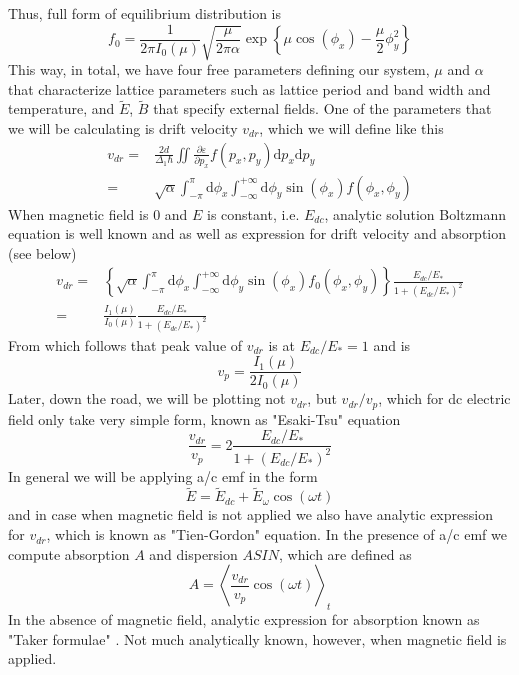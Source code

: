 \documentclass[40pt,letterpaper,physrev]{article}
\begin{document}
    Thus, full form of equilibrium distribution is
    \begin{equation}
    \boxed{
	f_0=\frac{1}{2\pi I_0(\mu)}\sqrt{\frac{\mu}{2\pi\alpha}}\exp{\left \{ \mu\cos(\phi_x)-\frac{\mu}{2}\phi^2_y\right \} } }
	\end{equation}
	This way, in total, we have four free parameters defining our system, $\mu$ and $\alpha$ that characterize lattice parameters such as lattice period and band width and temperature, and $\tilde{E}$, $\tilde{B}$ that specify external fields.
	One of the parameters that we will be calculating is drift 
	velocity $v_{dr}$, which we will define like this
	\begin{align}
		v_{dr}=&\frac{2d}{\Delta_1\hbar}\iint
			\frac{\partial\varepsilon}{\partial p_x}f(p_x,p_y)\text{d}p_x\text{d}p_y \\
			=&\sqrt{\alpha}\int^{\pi}_{-\pi}\text{d}\phi_x\int^{+\infty}_{-\infty}\text{d}\phi_y\sin(\phi_x)f(\phi_x,\phi_y)\label{eq:v_dr_generic}
	\end{align}
    When magnetic field is $0$ and $E$ is constant, i.e. $E_{dc}$, analytic 
    solution Boltzmann equation is well known and as well as expression for 
    drift velocity and absorption (see below) \cite{WAC01}
    \begin{align}
	v_{dr}=&\left \{ \sqrt{\alpha}\int^{\pi}_{-\pi}\text{d}\phi_x\int^{+\infty}_{-\infty}\text{d}\phi_y\sin(\phi_x)f_0(\phi_x,\phi_y)\right \}
	\frac{E_{dc}/E_*}{1+(E_{dc}/E_*)^2} \\
	=&\frac{I_1(\mu)}{I_0(\mu)}\frac{E_{dc}/E_*}{1+(E_{dc}/E_*)^2}
    \end{align}
	From which follows that peak value of $v_{dr}$ is at $E_{dc}/E_*=1$ and is 
	\begin{equation}
		v_p=\frac{I_1(\mu)}{2I_0(\mu)}\label{eq:v_peak}
	\end{equation}
	Later, down the road, we will be plotting not $v_{dr}$, but $v_{dr}/v_p$,
	which for dc electric field only take very simple form, known as "Esaki-Tsu" equation
	\begin{equation}
		\frac{v_{dr}}{v_p}=2\frac{E_{dc}/E_*}{1+(E_{dc}/E_*)^2}
	\end{equation}
	In general we will be applying a/c emf in the form 
	\begin{equation}
	\tilde{E}=\tilde{E}_{dc}+\tilde{E}_{\omega}\cos(\omega t)\label{eq:tilde_E_as_a_function_of_time}
	\end{equation}
	and in case when magnetic field is not applied we also have analytic expression for $v_{dr}$, which is known as "Tien-Gordon" equation. In the presence of a/c emf we compute absorption $A$ and dispersion $ASIN$, which are defined as 
	\begin{equation}
	A=\left <\frac{v_{dr}}{v_p}\cos(\omega t) \right >_{t}
	\end{equation}
    In the absence of magnetic field, analytic expression for absorption known as "Taker formulae" \cite{WAC01}. 
    Not much analytically known, however, when magnetic field is applied.
    	
\end{document}
